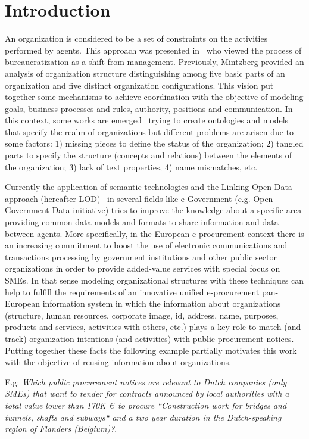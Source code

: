 \documentclass{llncs}
\begin{document}
\section{Introduction}
An organization is considered to be a set of constraints on the activities performed by agents.  
This approach was presented in~\cite{Weber1978} who viewed the process of bureaucratization as a shift 
from management. Previously, Mintzberg provided an analysis of organization structure 
distinguishing among five basic parts of an organization and five distinct organization configurations. 
This vision put together some mechanisms to achieve coordination with the objective of modeling goals, 
business processes and rules, authority, positions and communication. In this context, some works 
are emerged~\cite{Fox95anorganisation} trying to create ontologies and models that specify the realm of organizations but 
different problems are arisen due to some factors: 1) missing pieces to define the status of the organization; 
2) tangled parts to specify the structure (concepts and relations) between the elements of the organization; 
3) lack of text properties, 4) name mismatches, etc. 

Currently the application of semantic technologies and the Linking Open Data approach (hereafter LOD)~\cite{heath11linked} in several fields 
like e-Government (e.g. Open Government Data initiative) tries to improve the knowledge about a specific area providing 
common data models and formats to share information and data between agents. More specifically, 
in the European e-procurement context there is an increasing commitment to boost the use 
of electronic communications and transactions processing by government institutions and other public sector organizations 
in order to provide added-value services with special focus on SMEs. In that sense modeling organizational structures
with these techniques can help to fulfill the requirements of an innovative unified e-procurement pan-European information 
system in which the information about organizations (structure, human resources, corporate image, id, address, name, purposes, products and 
services, activities with others, etc.) plays a key-role to match (and track) organization intentions (and activities) 
with public procurement notices. Putting together these facts the following example partially 
motivates this work with the objective of reusing information about organizations.

E.g: \textit{Which public procurement notices are relevant to Dutch companies (only SMEs) that want to tender for
contracts announced by local authorities with a total value lower than 170K \euro\mbox{ }to procure
``Construction work for bridges and tunnels, shafts and subways`` and a two year duration in the 
Dutch-speaking region of Flanders (Belgium)?}.
\end{document}
